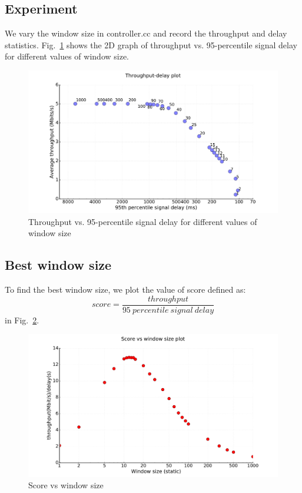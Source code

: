 \documentclass{article}
\begin{document}
\subsection{Experiment}
We vary the window size in controller.cc and record the throughput and
delay statistics. Fig.~\ref{A} shows the 2D graph of throughput vs.
95-percentile signal delay for different values of window size.
\begin{figure}[h]
\includegraphics[width=\columnwidth]{"../A/A"}
\caption{Throughput vs. 95-percentile signal delay for different values of window size}
\label{A}
\end{figure}

\subsection{Best window size}
To find the best window size, we plot the value of score defined as:
\[
  score = \frac{throughput}{95~percentile\ signal\ delay}
\]
in Fig.~\ref{A-score}.
\begin{figure}[h]
\includegraphics[width=\columnwidth]{"../A/A-score"}
\caption{Score vs window size}
\label{A-score}
\end{figure}
\end{document}
